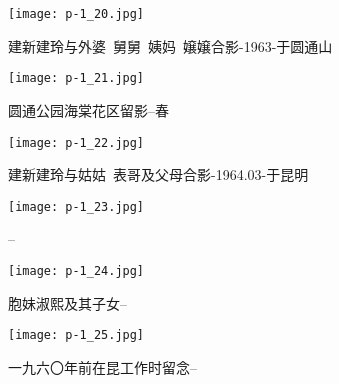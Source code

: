 \clearpage


\begin{figure}
    \begin{center}
        \texttt{[image: p-1\_20.jpg]}
        \caption{建新建玲与外婆~舅舅~姨妈~嬢嬢合影-1963-于圆通山}
    \end{center}
\end{figure}

\clearpage


\begin{figure}
    \begin{center}
        \texttt{[image: p-1\_21.jpg]}
        \caption{圆通公园海棠花区留影--春}
    \end{center}
\end{figure}

\clearpage


\begin{figure}
    \begin{center}
        \texttt{[image: p-1\_22.jpg]}
        \caption{建新建玲与姑姑~表哥及父母合影-1964.03-于昆明}
    \end{center}
\end{figure}

\clearpage


\begin{figure}
    \begin{center}
        \texttt{[image: p-1\_23.jpg]}
        \caption{--}
    \end{center}
\end{figure}

\clearpage


\begin{figure}
    \begin{center}
        \texttt{[image: p-1\_24.jpg]}
        \caption{胞妹淑熙及其子女--}
    \end{center}
\end{figure}

\clearpage


\begin{figure}
    \begin{center}
        \texttt{[image: p-1\_25.jpg]}
        \caption{一九六〇年前在昆工作时留念--}
    \end{center}
\end{figure}

\clearpage


